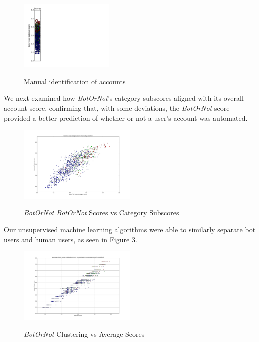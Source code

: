 \documentclass{sig-alternate-05-2015}
\begin{document}
\begin{figure}[h!]
	\caption{Manual identification of accounts}
	\centering
		\includegraphics[width=0.4\textwidth]{imgs/scorenbotcolor}
	\label{fig:scorescat}
	
\end{figure}

We next examined how \emph{BotOrNot}'s category subscores aligned with its overall account score, confirming that, with some deviations, the \emph{BotOrNot} score provided a better prediction of whether or not a user's account was automated.

\begin{figure}[h!]
	\caption{\emph{BotOrNot} \emph{BotOrNot} Scores vs Category Subscores}
	\centering
		\includegraphics[width=0.5\textwidth]{imgs/svacs}
	\label{fig:scoresubscore}
\end{figure}

Our unsupervised machine learning algorithms were able to similarly separate bot users and human users, as seen in Figure \ref{fig:clustscore}.

\begin{figure}[h!]
	\caption{\emph{BotOrNot} Clustering vs Average Scores}
	\centering
		\includegraphics[width=0.5\textwidth]{imgs/ourscorevssubscore}
	\label{fig:clustscore}
\end{figure}
\end{document}

